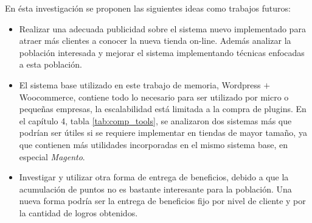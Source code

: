 En ésta investigación se proponen las siguientes ideas como trabajos futuros:


\begin{itemize}

\item Realizar una adecuada publicidad sobre el sistema nuevo implementado para
	atraer más clientes a conocer la nueva tienda on-line. Además analizar
	la población interesada y mejorar el sistema implementando técnicas
	enfocadas a esta población.

\item El sistema base utilizado en este trabajo de memoria, Wordpress $+$ Woocommerce, contiene
todo lo necesario para ser utilizado por micro o pequeñas empresas, la escalabilidad está limitada
a la compra de plugins. En el capítulo 4, tabla \ref{tab:comp_tools}, se analizaron dos sistemas más
que podrían ser útiles si se requiere implementar {\GAM} en tiendas de mayor tamaño, ya que contienen
más utilidades incorporadas en el mismo sistema base, en especial \emph{Magento}.

\item Investigar y utilizar otra forma de entrega de beneficios, debido a que la
acumulación de puntos no es bastante interesante para la población. Una nueva forma podría ser la entrega
de beneficios fijo por nivel de cliente y por la cantidad de logros obtenidos.

\end{itemize}


